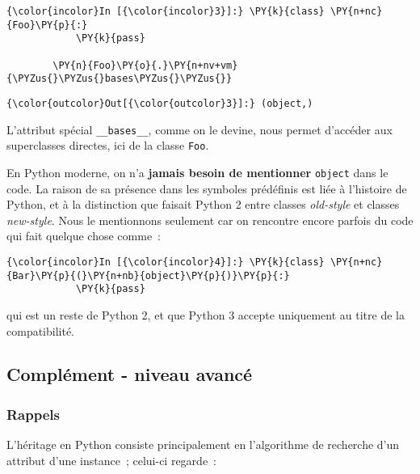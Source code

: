     \begin{Verbatim}[commandchars=\\\{\}]
{\color{incolor}In [{\color{incolor}3}]:} \PY{k}{class} \PY{n+nc}{Foo}\PY{p}{:}
            \PY{k}{pass}
        
        \PY{n}{Foo}\PY{o}{.}\PY{n+nv+vm}{\PYZus{}\PYZus{}bases\PYZus{}\PYZus{}}
\end{Verbatim}


\begin{Verbatim}[commandchars=\\\{\}]
{\color{outcolor}Out[{\color{outcolor}3}]:} (object,)
\end{Verbatim}
            
    L'attribut spécial \texttt{\_\_bases\_\_}, comme on le devine, nous
permet d'accéder aux superclasses directes, ici de la classe
\texttt{Foo}.

    En Python moderne, on n'a \textbf{jamais besoin de mentionner}
\texttt{object} dans le code. La raison de sa présence dans les symboles
prédéfinis est liée à l'histoire de Python, et à la distinction que
faisait Python 2 entre classes \emph{old-style} et classes
\emph{new-style}. Nous le mentionnons seulement car on rencontre encore
parfois du code qui fait quelque chose comme~:

    \begin{Verbatim}[commandchars=\\\{\}]
{\color{incolor}In [{\color{incolor}4}]:} \PY{k}{class} \PY{n+nc}{Bar}\PY{p}{(}\PY{n+nb}{object}\PY{p}{)}\PY{p}{:}
            \PY{k}{pass}
\end{Verbatim}


    qui est un reste de Python 2, et que Python 3 accepte uniquement au
titre de la compatibilité.

    \hypertarget{compluxe9ment---niveau-avancuxe9}{%
\subsection{Complément - niveau
avancé}\label{compluxe9ment---niveau-avancuxe9}}

    \hypertarget{rappels}{%
\subsubsection{Rappels}\label{rappels}}

    L'héritage en Python consiste principalement en l'algorithme de
recherche d'un attribut d'une instance~; celui-ci regarde~:

